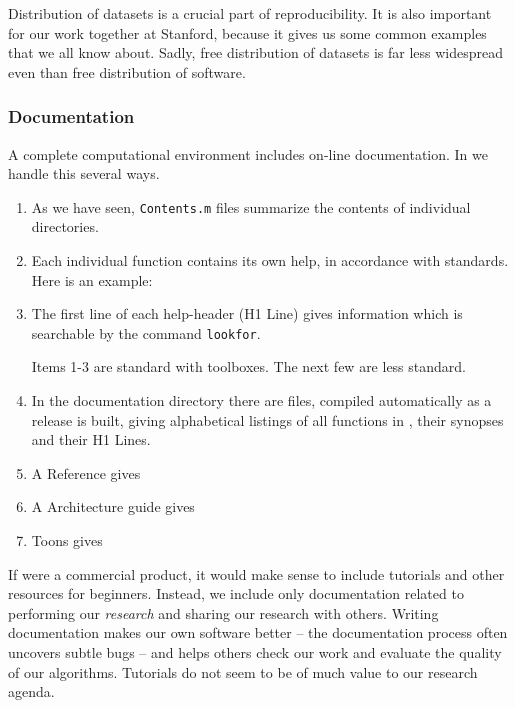 
Distribution of datasets is a crucial
part of reproducibility.  It is also important
for our work together at Stanford, because
it gives us some common examples that we all know
about.  Sadly, free distribution of datasets is
far less widespread even than free distribution of software.
 
\subsubsection{Documentation}

A complete computational environment includes
on-line documentation.  In \WaveLab
we handle this several ways.

\begin{enumerate}
\item
As we have seen, {\tt Contents.m} files
summarize the contents of individual directories.

\item Each individual function contains its own
help, in accordance with \Matlab standards.
Here is an example:


\item The first line of each help-header (H1 Line) gives
information which is searchable by the \Matlab
command {\tt lookfor}.

Items 1-3 are standard with \Matlab toolboxes. The next few are less
standard.

\item In the documentation directory
there are files, compiled automatically
as a release is built, giving alphabetical
listings of all functions in \WaveLab,
their synopses and their H1 Lines.

\item A \WaveLab Reference gives %

\item A \WaveLab Architecture guide
gives %

\item Toons gives %

\end{enumerate}

If \WaveLab were a commercial product,
it would make sense to include tutorials
and other resources for beginners.
Instead, we include only documentation
related to performing our {\it research} and sharing
our research with others. Writing documentation makes our own software
better -- the documentation process often uncovers
subtle bugs -- and helps others check
our work and evaluate the quality of our algorithms.
Tutorials do not seem to be of much value to our research agenda.
   
